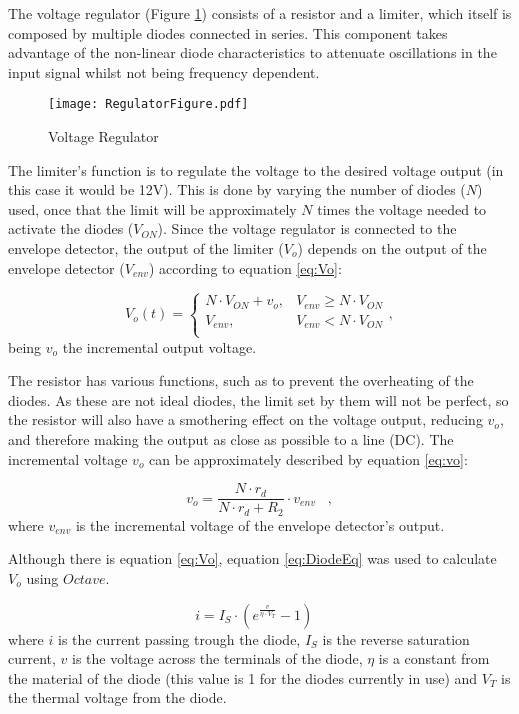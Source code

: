 The voltage regulator (Figure \ref{fig:VR}) consists of a resistor and a limiter, which itself is composed by multiple diodes connected in series. This component takes advantage of the non-linear diode characteristics to attenuate oscillations in the input signal whilst not being frequency dependent.


\begin{figure}[H]
    \centering
    \texttt{[image: RegulatorFigure.pdf]}
    \caption{Voltage Regulator}
    \label{fig:VR}
\end{figure}

The limiter's function is to regulate the voltage to the desired voltage output (in this case it would be 12V). This is done by varying the number of diodes ($N$) used, once that the limit will be approximately $N$ times the voltage needed to activate the diodes ($V_{ON}$). Since the voltage regulator is connected to the envelope detector, the output of the limiter ($V_o$) depends on the output of the envelope detector ($V_{env}$) according to equation \ref{eq:Vo}:

\begin{equation}
    V_o(t)= \begin{cases} N\cdot V_{ON} + v_o, & V_{env} \geq N\cdot V_{ON} \\ V_{env}, & V_{env} < N\cdot V_{ON}\\ \end{cases} ,
    \label{eq:Vo}
\end{equation}
being $v_o$ the incremental output voltage.

The resistor has various functions, such as to prevent the overheating of the diodes. As these are not ideal diodes, the limit set by them will not be perfect, so the resistor will also have a smothering effect on the voltage output, reducing $v_o$, and therefore making the output as close as possible to a line (DC).
The incremental voltage $v_o$ can be approximately described by equation \ref{eq:vo}:

\begin{equation}
    v_o=\frac{N\cdot r_d}{N\cdot r_d+R_2}\cdot v_{env}\hspace{10pt},
    \label{eq:vo}
\end{equation}
where $v_{env}$ is the incremental voltage of the envelope detector's output.


Although there is equation \ref{eq:Vo}, equation \ref{eq:DiodeEq} was used to calculate $V_o$ using $Octave$.

\begin{equation}
    i=I_S\cdot (e^\frac{v}{\eta\cdot V_T}-1) \hspace{10pt}
    \label{eq:DiodeEq}
\end{equation}
where $i$ is the current passing trough the diode, $I_S$ is the reverse saturation current, $v$ is the voltage across the terminals of the diode, $\eta$ is a constant from the material of the diode (this value is 1 for the diodes currently in use) and $V_T$ is the thermal voltage from the diode.

